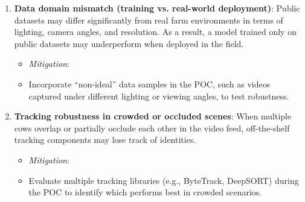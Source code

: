 \documentclass{article}
\begin{document}
\begin{enumerate}
  \item \textbf{Data domain mismatch (training vs. real-world deployment)}:
      Public datasets may differ significantly from real farm environments in terms of lighting, camera angles, and resolution. 
      As a result, a model trained only on public datasets may underperform when deployed in the field.  
      \begin{itemize}
        \item \emph{Mitigation}: 
        \item[] Incorporate “non-ideal” data samples in the POC, such as videos captured under different lighting 
        or viewing angles, to test robustness. 
      \end{itemize}

  \item \textbf{Tracking robustness in crowded or occluded scenes}:
      When multiple cows overlap or partially occlude each other in the video feed, off-the-shelf tracking components may lose track 
      of identities.  
      \begin{itemize}
        \item \emph{Mitigation}: 
        \item[] Evaluate multiple tracking libraries (e.g., ByteTrack, DeepSORT) during the POC to identify which 
        performs best in crowded scenarios. 
      \end{itemize}

\end{enumerate}
\end{document}

